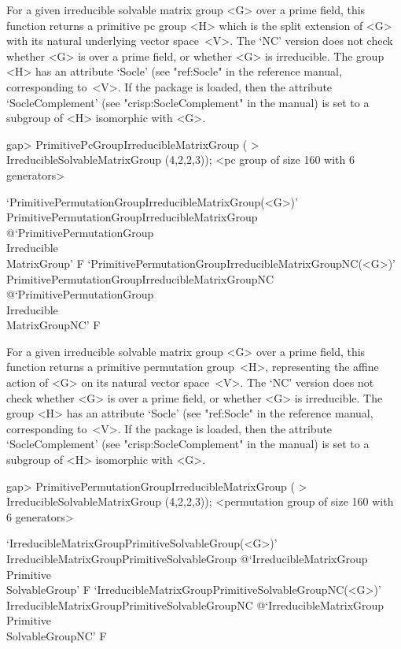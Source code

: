 For a given irreducible solvable matrix group <G> over a prime field, this function
returns a primitive pc group <H> which is the split extension of <G> with its natural
underlying vector space~<V>. The `NC' version does not check whether <G> is over a prime field, 
or whether <G> is irreducible. The group <H> has an attribute `Socle' (see "ref:Socle" 
in the {\GAP} reference manual, corresponding to~<V>. If the package {\CRISP} is loaded, 
then the attribute `SocleComplement' (see "crisp:SocleComplement" in the {\CRISP} manual) is set to a subgroup of 
<H> isomorphic with <G>.

\beginexample
gap> PrimitivePcGroupIrreducibleMatrixGroup (
>       IrreducibleSolvableMatrixGroup (4,2,2,3));
<pc group of size 160 with 6 generators>
\endexample

\>`PrimitivePermutationGroupIrreducibleMatrixGroup(<G>)'%
{PrimitivePermutationGroupIrreducibleMatrixGroup}%
@{`PrimitivePermutationGroup\\Irreducible\\MatrixGroup'} F
\>`PrimitivePermutationGroupIrreducibleMatrixGroupNC(<G>)'%
{PrimitivePermutationGroupIrreducibleMatrixGroupNC}%
@{`PrimitivePermutationGroup\\Irreducible\\MatrixGroupNC'} F

For a given irreducible solvable matrix group <G> over a prime field, this function
returns a primitive permutation group~<H>, representing the affine action of <G> on its natural
vector space~<V>. The `NC' version does not check whether <G> is over a prime field, 
or whether <G> is irreducible. The group <H> has an attribute `Socle' (see "ref:Socle" 
in the {\GAP} reference manual, corresponding to~<V>. If the package {\CRISP} is loaded, 
then the attribute `SocleComplement' (see "crisp:SocleComplement" in the {\CRISP} manual) is set to a subgroup of 
<H> isomorphic with <G>.

\beginexample
gap> PrimitivePermutationGroupIrreducibleMatrixGroup (
>       IrreducibleSolvableMatrixGroup (4,2,2,3));
<permutation group of size 160 with 6 generators>
\endexample

\>`IrreducibleMatrixGroupPrimitiveSolvableGroup(<G>)'%
{IrreducibleMatrixGroupPrimitiveSolvableGroup}%
@{`IrreducibleMatrixGroup\\Primitive\\SolvableGroup'} F
\>`IrreducibleMatrixGroupPrimitiveSolvableGroupNC(<G>)'%
{IrreducibleMatrixGroupPrimitiveSolvableGroupNC}%
@{`IrreducibleMatrixGroup\\Primitive\\SolvableGroupNC'} F

